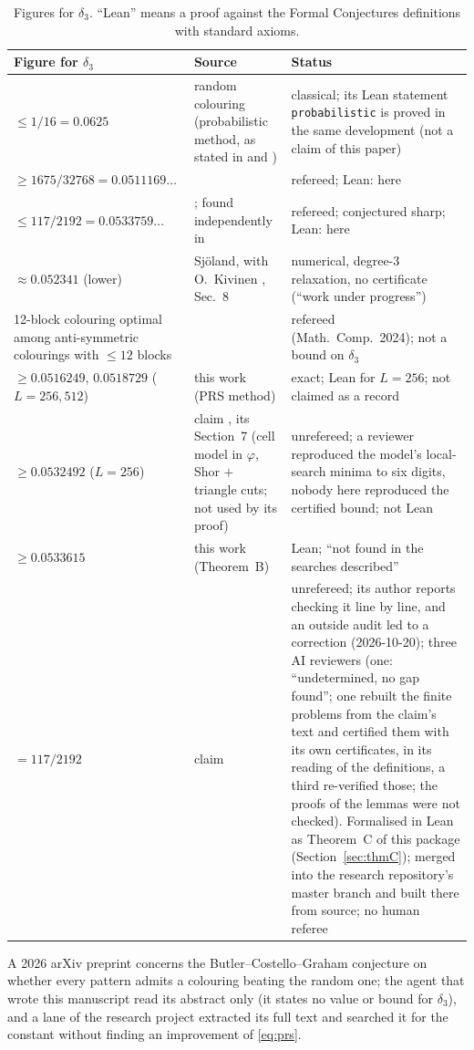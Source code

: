 \documentclass[11pt]{amsart}
\theoremstyle{remark}
\newcommand{\lean}[1]{\texttt{#1}}
\begin{document}
\begin{table}[h]
\centering\small
\begin{tabular}{p{3.9cm}p{3.1cm}p{5.5cm}}
\toprule
Figure for $\delta_3$ & Source & Status\\
\midrule
$\le 1/16=0.0625$ & random colouring (probabilistic method, as stated in \cite{EP1186} and \cite{FC}) & classical; its Lean statement \lean{probabilistic} is proved in the same development (not a claim of this paper)\\
$\ge1675/32768=0.0511169\ldots$ & \cite{PRS08} & refereed; Lean: here\\
$\le117/2192=0.0533759\ldots$ & \cite{PRS08}; found independently in \cite{BCG10} & refereed; conjectured sharp; Lean: here\\
$\approx0.052341$ (lower) & Sj\"oland, with O.\ Kivinen \cite{Sjoland14}, Sec.~8 & numerical, degree-3 relaxation, no certificate (``work under progress'')\\
12-block colouring optimal among anti-symmetric colourings with $\le12$ blocks & \cite{GKW23} & refereed (Math.\ Comp.\ 2024); not a bound on $\delta_3$\\
$\ge0.0516249$, $0.0518729$ ($L=256,512$) & this work (PRS method) & exact; Lean for $L=256$; not claimed as a record\\
$\ge0.0532492$ ($L=256$) & claim \cite{Toledo26}, its Section~7 (cell model in $\varphi$, Shor $+$ triangle cuts; not used by its proof) & unrefereed; a reviewer reproduced the model's local-search minima to six digits, nobody here reproduced the certified bound; not Lean\\
$\ge0.0533615$ & this work (Theorem~B) & Lean; ``not found in the searches described''\\
$=117/2192$ & claim \cite{Toledo26} & unrefereed; its author reports checking it line by line, and an outside audit led to a correction (2026-10-20); three AI reviewers (one: ``undetermined, no gap found''; one rebuilt the finite problems from the claim's text and certified them with its own certificates, in its reading of the definitions, a third re-verified those; the proofs of the lemmas were not checked). Formalised in Lean as Theorem~C of this package (Section~\ref{sec:thmC}); merged into the research repository's master branch and built there from source; no human referee\\
\bottomrule
\end{tabular}
\caption{Figures for $\delta_3$. ``Lean'' means a proof against the Formal Conjectures definitions with standard axioms.}\label{tab:prior}
\end{table}
A 2026 arXiv preprint \cite{YangMao26} concerns the Butler--Costello--Graham conjecture on whether every pattern admits a colouring beating the random one; the agent that wrote this manuscript read its abstract only (it states no value or bound for $\delta_3$), and a lane of the research project extracted its full text and searched it for the constant without finding an improvement of \eqref{eq:prs}.
\end{document}
